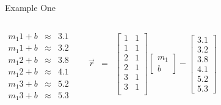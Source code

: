 \documentclass[svgnames,table,,aspectratio=169]{beamer}
\newcommand{\columnVector}[1]{%
  \left[
    \begin{array}{r}
    #1                           
    \end{array}
  \right]
}
\begin{document}
\begin{frame}{Example One}

  \begin{columns}

    \begin{eqnarray*}
      m_1 1 + b & \approx & 3.1 \\
      m_1 1 + b & \approx & 3.2 \\
      m_1 2 + b & \approx & 3.8 \\
      m_1 2 + b & \approx & 4.1 \\
      m_1 3 + b & \approx & 5.2 \\
      m_1 3 + b & \approx & 5.3 \\
    \end{eqnarray*}


    \begin{eqnarray*}
      \vec{r} & = & 
      \left[
      \begin{array}{rr}
        1 & 1 \\
        1 & 1 \\
        2 & 1 \\
        2 & 1 \\
        3 & 1 \\
        3 & 1 \\
      \end{array}
      \right]
      \columnVector{m_1 \\ b} - 
      \columnVector{3.1 \\ 3.2 \\ 3.8 \\ 4.1 \\ 5.2 \\ 5.3}
  \end{eqnarray*}

    
  \end{columns}
\end{frame}
\end{document}
